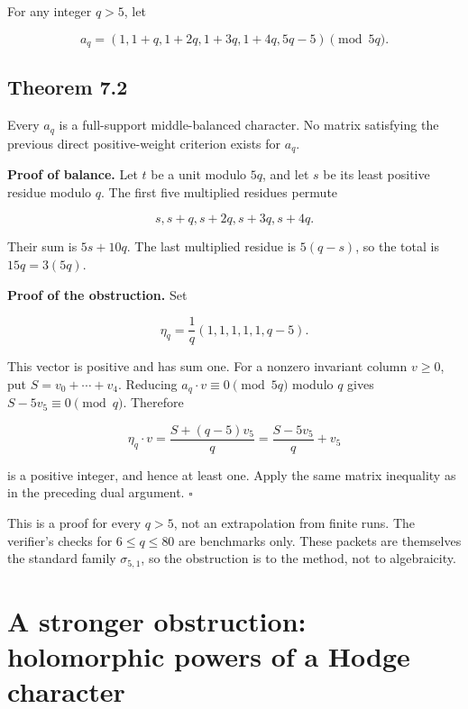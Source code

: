 For any integer \(q>5\), let

\begin{equation}\label{eq:transfer210-7.1}
a_q=(1,1+q,1+2q,1+3q,1+4q,5q-5)\pmod {5q}.\end{equation}

\hypertarget{transfer210-theorem-7.2}{%
\subsection{Theorem 7.2}\label{transfer210-theorem-7.2}}

Every \(a_q\) is a full-support middle-balanced character. No matrix
satisfying the previous direct positive-weight criterion exists for
\(a_q\).

\textbf{Proof of balance.} Let \(t\) be a unit modulo \(5q\), and let
\(s\) be its least positive residue modulo \(q\). The first five
multiplied residues permute

\[
s,s+q,s+2q,s+3q,s+4q.
\]

Their sum is \(5s+10q\). The last multiplied residue is \(5(q-s)\), so
the total is \(15q=3(5q)\).

\textbf{Proof of the obstruction.} Set

\[
\eta_q=\frac1q(1,1,1,1,1,q-5).
\]

This vector is positive and has sum one. For a nonzero invariant column
\(v\ge0\), put \(S=v_0+\cdots+v_4\). Reducing
\(a_q\cdot v\equiv0\pmod {5q}\) modulo \(q\) gives
\(S-5v_5\equiv0\pmod q\). Therefore

\[
\eta_q\cdot v=\frac{S+(q-5)v_5}{q}
=\frac{S-5v_5}{q}+v_5
\]

is a positive integer, and hence at least one. Apply the same matrix
inequality as in the preceding dual argument. \hfill\ensuremath{\square}

This is a proof for every \(q>5\), not an extrapolation from finite
runs. The verifier's checks for \(6\le q\le80\) are benchmarks only.
These packets are themselves the standard family \(\sigma_{5,1}\), so
the obstruction is to the method, not to algebraicity.

\hypertarget{transfer210-a-stronger-obstruction-holomorphic-powers-of-a-hodge-character}{%
\section{A stronger obstruction: holomorphic powers of a Hodge
character}\label{transfer210-a-stronger-obstruction-holomorphic-powers-of-a-hodge-character}}


